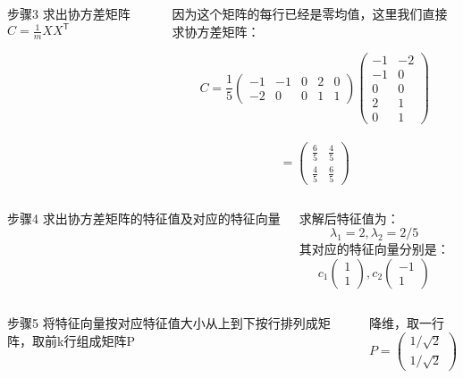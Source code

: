   
   \begin{frame}
  \begin{columns}
  \column{3cm}
  \begin{block}{步骤3}
求出协方差矩阵\(C=\frac{1}{m}XX^\mathsf{T}\)
\end{block}
  \column{6cm}
  \begin{example}
   因为这个矩阵的每行已经是零均值，这里我们直接求协方差矩阵：
   
   \[C=\frac{1}{5}\begin{pmatrix}
  -1 & -1 & 0 & 2 & 0 \\
  -2 & 0 & 0 & 1 & 1
\end{pmatrix}\begin{pmatrix}
  -1 & -2 \\
  -1 & 0  \\
  0  & 0  \\
  2  & 1  \\
  0  &1
\end{pmatrix}\] \\ \[= \begin{pmatrix}
  \frac{6}{5} & \frac{4}{5} \\
  \frac{4}{5} &\frac{6}{5}
\end{pmatrix}\]
\end{example}
  \end{columns}
  \end{frame}
  
   \begin{frame}
  \begin{columns}
  \column{4cm}
  \begin{block}{步骤4}
  求出协方差矩阵的特征值及对应的特征向量
  \end{block}
  \column{4cm}
  \begin{example}
   求解后特征值为：
   \[\lambda_1=2,\lambda_2=2/5\]
   其对应的特征向量分别是：
   \[c_1\begin{pmatrix}
  1 \\
  1
\end{pmatrix},c_2\begin{pmatrix}
  -1 \\
  1
\end{pmatrix}\]
\end{example}
  \end{columns}
  \end{frame}
  
  \begin{frame}
  \begin{columns}
  \column{4cm}
  \begin{block}{步骤5}
将特征向量按对应特征值大小从上到下按行排列成矩阵，取前k行组成矩阵P
\end{block}
  \column{4cm}
  \begin{example}
降维，取一行\\
\[P=\begin{pmatrix}
  1/\sqrt{2}   \\
  1/\sqrt{2} 
  \end{pmatrix}\]
  \end{example}
  \end{columns}
  \end{frame}
  

